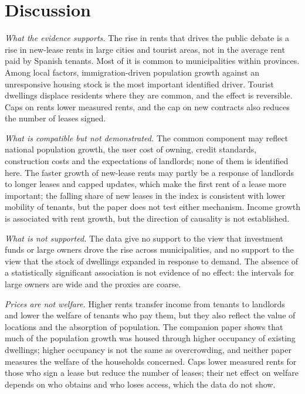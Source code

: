 \documentclass[11pt,a4paper]{article}
\begin{document}
\section{Discussion}\label{sec:discussion}

\textit{What the evidence supports.} The rise in rents that drives the public debate is a rise in new-lease rents in large cities and tourist areas, not in the average rent paid by Spanish tenants. Most of it is common to municipalities within provinces. Among local factors, immigration-driven population growth against an unresponsive housing stock is the most important identified driver. Tourist dwellings displace residents where they are common, and the effect is reversible. Caps on rents lower measured rents, and the cap on new contracts also reduces the number of leases signed.

\textit{What is compatible but not demonstrated.} The common component may reflect national population growth, the user cost of owning, credit standards, construction costs and the expectations of landlords; none of them is identified here. The faster growth of new-lease rents may partly be a response of landlords to longer leases and capped updates, which make the first rent of a lease more important; the falling share of new leases in the index is consistent with lower mobility of tenants, but the paper does not test either mechanism. Income growth is associated with rent growth, but the direction of causality is not established.

\textit{What is not supported.} The data give no support to the view that investment funds or large owners drove the rise across municipalities, and no support to the view that the stock of dwellings expanded in response to demand. The absence of a statistically significant association is not evidence of no effect: the intervals for large owners are wide and the proxies are coarse.

\textit{Prices are not welfare.} Higher rents transfer income from tenants to landlords and lower the welfare of tenants who pay them, but they also reflect the value of locations and the absorption of population. The companion paper shows that much of the population growth was housed through higher occupancy of existing dwellings; higher occupancy is not the same as overcrowding, and neither paper measures the welfare of the households concerned. Caps lower measured rents for those who sign a lease but reduce the number of leases; their net effect on welfare depends on who obtains and who loses access, which the data do not show.
\end{document}
